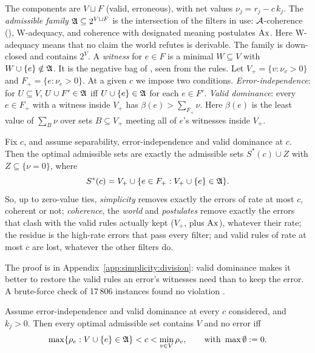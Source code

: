 \begin{definition}\label{def:simplicity:admissible}
The components are $V\sqcup F$ (valid, erroneous), with net values $\nu_j=r_j-c\,k_j$. The \emph{admissible family} $\mathfrak A\subseteq2^{V\sqcup F}$ is the intersection of the filters in use: $\mathcal{A}$-coherence (), W-adequacy, and coherence with designated meaning postulates $\mathrm{Ax}$. Here W-adequacy means that no claim the world refutes is derivable. The family is down-closed and contains $2^V$. A \emph{witness} for $e\in F$ is a minimal $W\subseteq V$ with $W\cup\{e\}\notin\mathfrak A$. It is the negative bag of , seen from the rules. Let $V_+=\{v:\nu_v>0\}$ and $F_+=\{e:\nu_e>0\}$.
At a given $c$ we impose two conditions. \emph{Error-independence}: for $U\subseteq V$, $U\cup F'\in\mathfrak A$ iff $U\cup\{e\}\in\mathfrak A$ for each $e\in F'$. \emph{Valid dominance}: every $e\in F_+$ with a witness inside $V_+$ has $\beta(e)>\sum_{F_+}\nu$. Here $\beta(e)$ is the least value of $\sum_B\nu$ over sets $B\subseteq V_+$ meeting all of $e$'s witnesses inside $V_+$.
\end{definition}

\begin{theorem}\label{thm:simplicity:division}
Fix $c$, and assume separability, error-independence and valid dominance at $c$. Then the optimal admissible sets are exactly the admissible sets $S^*(c)\cup Z$ with $Z\subseteq\{\nu=0\}$, where
\[
S^*(c)=V_+\cup\{e\in F_+:V_+\cup\{e\}\in\mathfrak A\}.
\]
So, up to zero-value ties, \emph{simplicity} removes exactly the errors of rate at most $c$, coherent or not; \emph{coherence}, the \emph{world} and \emph{postulates} remove exactly the errors that clash with the valid rules actually kept ($V_+$, plus $\mathrm{Ax}$), whatever their rate; the residue is the high-rate errors that pass every filter; and valid rules of rate at most $c$ are lost, whatever the other filters do.
\end{theorem}

The proof is in Appendix~\ref{app:simplicity:division}: valid dominance makes it better to restore the valid rules an error's witnesses need than to keep the error. A brute-force check of 17\,806 instances found no violation .

\begin{corollary}\label{cor:simplicity:window}
Assume error-independence and valid dominance at every $c$ considered, and $k_j>0$. Then every optimal admissible set contains $V$ and no error iff
\[
\max\{\rho_e:V\cup\{e\}\in\mathfrak A\}<c<\min_{v\in V}\rho_v,\qquad\text{with }\max\emptyset:=0.
\]
\end{corollary}

